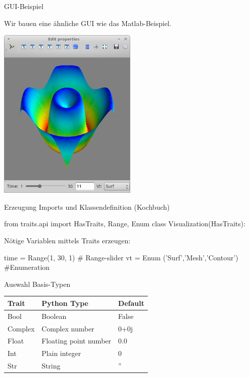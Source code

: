 \documentclass[hyperref={xetex}]{beamer}
\begin{document}
\begin{frame}[fragile]{GUI-Beispiel}

Wir bauen eine ähnliche GUI wie das Matlab-Beispiel. 
\begin{center}
\includegraphics[width=0.5\textwidth]{./figures/traitsui_sc.png}
\end{center}
\end{frame}

\begin{frame}[fragile]{Erzeugung}
Imports und Klassendefinition (Kochbuch)
  \begin{pyin}
from traits.api import HasTraits, Range, Enum
class Visualization(HasTraits):
\end{pyin}

Nötige Variablen mittels Traits erzeugen:
\begin{pyin}
      time = Range(1, 30, 1) # Range-slider
      vt = Enum ('Surf','Mesh','Contour') #Enumeration
  \end{pyin}

Auswahl Basis-Typen\\
\begin{tabular}[c]{lll}
  \textbf{Trait} & \textbf{Python Type} & \textbf{Default} \\\hline
  Bool & Boolean & False \\
  Complex & Complex number & 0+0j\\
  Float & Floating point number & 0.0 \\
  Int & Plain integer & 0\\
  Str & String &  ''\\
\end{tabular}

\end{frame}
\end{document}
